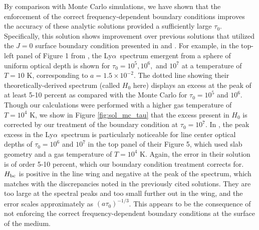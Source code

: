 \documentclass{aastex63}
\newcommand\lya{Ly$\alpha$\ }
\begin{document}
By comparison with Monte Carlo simulations, we have shown that the enforcement of the correct frequency-dependent boundary conditions improves the accuracy of these analytic solutions provided a sufficiently large $\tau_0$. Specifically, this solution shows improvement over previous solutions that utilized the $J=0$ surface boundary condition presented in \cite{1973MNRAS.162...43H} and \cite{1990ApJ...350..216N}. For example, in the top-left panel of Figure 1 from \cite{2006ApJ...649...14D}, the \lya spectrum emergent from a sphere of uniform optical depth is shown for $\tau_0=10^5, 10^6,$ and $10^7$ at a temperature of $T=10$ K, corresponding to $a=1.5 \times 10^{-2}$. The dotted line showing their theoretically-derived spectrum (called $H_0$ here) displays an excess at the peak of at least 5-10 percent as compared with the Monte Carlo for $\tau_0=10^5$ and $10^6$. Though our calculations were performed with a higher gas temperature of $T=10^4$ K, we show in Figure \ref{fig:sol_mc_tau} that the excess present in $H_0$ is corrected by our treatment of the boundary condition at $\tau_0 = 10^7$. In \citet{2015MNRAS.449.4336S}, the peak excess in the \lya spectrum is particularly noticeable for line center optical depths of $\tau_0=10^6$ and $10^7$ in the top panel of their Figure 5, which used slab geometry and a gas temperature of $T=10^4$ K. Again, the error in their solution is of order 5-10 percent, which our boundary condition treatment corrects for. $H_{\rm bc}$ is positive in the line wing and negative at the peak of the spectrum, which matches with the discrepancies noted in the previously cited solutions. They are too large at the spectral peaks and too small further out in the wing, and the error scales approximately as $(a\tau_0)^{-1/3}$. This appears to be the consequence of not enforcing the correct frequency-dependent boundary conditions at the surface of the medium.
\end{document}
